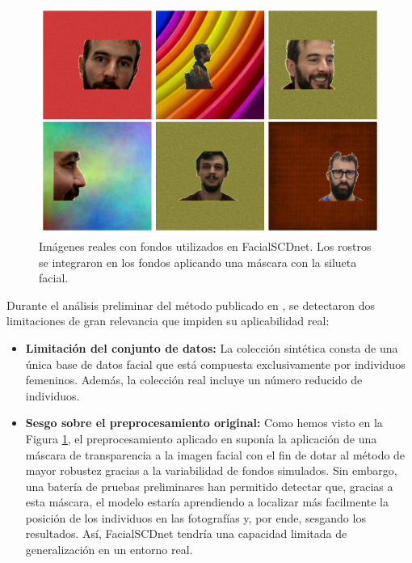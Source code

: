 \begin{figure}[h]
	\centering
	\includegraphics[scale=0.3]{imagenes/cap4/figura_FSCDnet.png}
	\caption[Ejemplos de imágenes reales con fondos FacialSCDnet.]{Imágenes reales con fondos utilizados en FacialSCDnet. Los rostros se integraron en los fondos aplicando una máscara con la silueta facial.}
	\label{fig24.2}
\end{figure}

Durante el análisis preliminar del método publicado en 
\cite{14}, se detectaron dos limitaciones de gran relevancia que impiden su aplicabilidad real:

\begin{itemize}
	\item \textbf{Limitación del conjunto de datos:} La colección sintética consta de una única base de datos facial que está compuesta exclusivamente por individuos femeninos. Además, la colección real incluye un número reducido de individuos.
	\item \textbf{Sesgo sobre el preprocesamiento original:} Como hemos visto en la Figura \ref{fig24.2}, el preprocesamiento aplicado en \cite{14} suponía la aplicación de una máscara de transparencia a la imagen facial con el fin de dotar al método de mayor robustez gracias a la variabilidad de fondos simulados. Sin embargo, una batería de pruebas preliminares han permitido detectar que, gracias a esta máscara, el modelo estaría aprendiendo a localizar más facilmente la posición de los individuos en las fotografías y, por ende, sesgando los resultados. Así, FacialSCDnet tendría una capacidad limitada de generalización en un entorno real.
\end{itemize}

